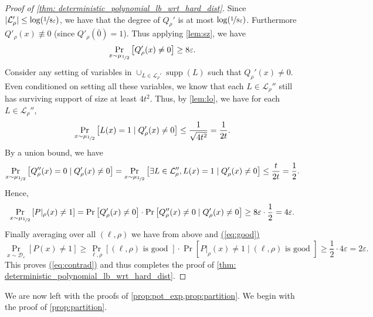 \documentclass[10pt,a4paper]{article}
\renewcommand{\eqref}[1]{\hyperref[#1]{(\ref*{#1})}}
\theoremstyle{plain}
\theoremstyle{definition}
\renewcommand{\epsilon}{\varepsilon}
\newcommand{\eps}{\epsilon}
\newcommand{\union}{\mathbin{\cup}}
\newcommand{\supp}{\operatorname{supp}}
\newcommand{\calD}{{\mathcal{D}}}
\newcommand{\calL}{{\mathcal{L}}}
\newcommand{\half}{\nicefrac{1}{2}}
\renewcommand{\calL}{\mathcal{L}}
\begin{document}
\begin{proof}[Proof of {\cref{thm:
      deterministic_polynomial_lb_wrt_hard_dist}}]
Since $|\calL_\rho'| \leq \log(\nicefrac1{8\eps})$, we have that the
degree of $Q_\rho'$ is at most $\log(\nicefrac1{8\eps})$. Furthermore $Q'_\rho(x) \not\equiv 0$ (since $Q'_\rho(\bar{0})=1$). Thus applying
\cref{lem:sz}, we have
\[
\Pr_{x \sim \mu_{\half}}\left[ Q_\rho'(x) \neq 0 \right] \geq 8\eps.
\]
Consider any setting of variables in $\union_{L \in
  \calL_\rho'}\supp(L)$ such that $Q_\rho'(x) \neq
0$. Even conditioned on setting all these variables, we know that each $L \in
\calL_\rho''$ still has surviving support of size at least
$4t^2$. Thus, by \cref{lem:lo}, we have for each $L \in \calL_\rho''$,
\[
\Pr_{x \sim \mu_{\half}}\left[ L(x) = 1 \mid Q_\rho'(x)
  \neq 0\right] \leq \frac{1}{\sqrt{4t^2}} = \frac1{2t}.
\]
By a union bound, we have
\[\Pr_{x \sim \mu_{\half}} \left[ Q''_\rho(x) = 0 \mid Q'_\rho(x) \neq
    0 \right] = \Pr_{x \sim \mu_{\half}} \left[ \exists L \in \calL_\rho'',
      L(x) = 1 \mid Q'_\rho(x) \neq
    0 \right] \leq \frac{t}{2t} = \frac12.
\]
Hence, 
\[\Pr_{x \sim \mu_{\half}} \left[ P|_\rho(x) \neq 1 \right] =
  \Pr\left[Q'_\rho(x) \neq 0 \right] \cdot \Pr \left[ Q''_\rho(x) \neq 0 \mid Q'_\rho(x) \neq
    0 \right] \geq  8\eps \cdot \frac12 = 4\eps.
\]
Finally averaging over all $(\ell, \rho)$ we have from above and \eqref{eq:good} 
\[
\Pr_{x \sim \calD_\eps} \left[ P(x) \neq 1\right] \geq \Pr_{\ell,
  \rho}\left[ (\ell,\rho) \text{ is good } \right] \cdot \Pr\left[
  P|_\rho(x) \neq 1 \mid  (\ell,\rho) \text{ is good } \right ] \geq
\frac12 \cdot 4\eps = 2\eps.
\]
This proves \eqref{eq:contrad} and thus completes the proof of \cref{thm: deterministic_polynomial_lb_wrt_hard_dist}.
\end{proof}

We are now left with the proofs of
\cref{prop:pot_exp,prop:partition}. We begin with the
proof of \cref{prop:partition}.
\end{document}
